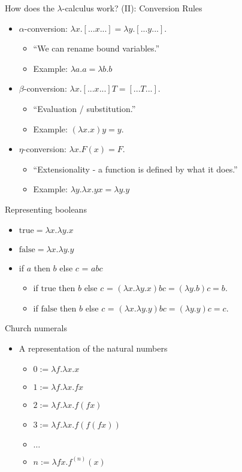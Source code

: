 \documentclass{beamer}
\newcommand{\true}{\mathrm{true}}
\newcommand{\false}{\mathrm{false}}
\begin{document}
\begin{frame}{How does the $\lambda$-calculus work? (II): Conversion Rules}
\begin{itemize}
\item $\alpha$-conversion: $\lambda x.[...x...] = \lambda y.[...y...]$.  
  \begin{itemize}
  \item ``We can rename bound variables.''
  \item Example: $\lambda a.a = \lambda b.b$
  \end{itemize}
\item $\beta$-conversion: $\lambda x.[...x...] T = [...T...]$. 
  \begin{itemize}
    \item ``Evaluation / substitution.''
    \item Example: $(\lambda x.x)y = y.$
  \end{itemize}
\item $\eta$-conversion: $\lambda x.F(x) = F$. 
  \begin{itemize}
    \item ``Extensionality - a function is defined by what it does.''
    \item Example: $\lambda y.\lambda x.yx =\lambda y.y$
  \end{itemize}
\end{itemize}
\end{frame}

\begin{frame}{Representing booleans}
\begin{itemize}
\item $\true = \lambda x . \lambda y .x$
\item $\false = \lambda x . \lambda y .y$
\item if $a$ then $b$ else $c$ = $abc$
\begin{itemize}
\item if $\true$ then $b$ else $c$ = $(\lambda x . \lambda y .x) bc =
(\lambda y . b) c = b$.
\item if $\false$ then $b$ else $c$ = $(\lambda x . \lambda y .y) bc =
(\lambda y . y) c = c$.
\end{itemize}
\end{itemize}
\end{frame}

\begin{frame}{Church numerals}
\begin{itemize}
\item A representation of the natural numbers 
\begin{itemize}
\item $0 := \lambda f.\lambda x.x$
\item $1 := \lambda f.\lambda x.f x$
\item $2 := \lambda f.\lambda x.f (f x)$
\item $3 := \lambda f.\lambda x.f (f (f x))$
\item $\ldots$
\item $n := \lambda fx. f^{(n)}(x)$
\end{itemize}
\end{itemize}
\end{frame}
\end{document}
